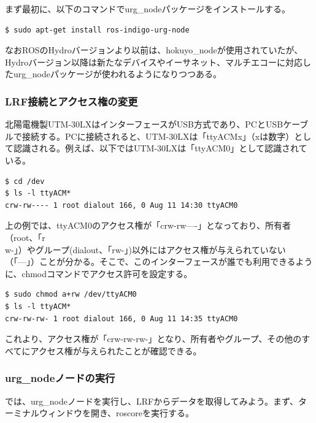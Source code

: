 まず最初に、以下のコマンドでurg\_nodeパッケージをインストールする。

\begin{lstlisting}[language=ROS]
$ sudo apt-get install ros-indigo-urg-node
\end{lstlisting}

なおROSのHydroバージョンより以前は、hokuyo\_nodeが使用されていたが、Hydroバージョン以降は新たなデバイスやイーサネット、マルチエコーに対応したurg\_nodeパッケージが使われるようになりつつある。

\subsubsection{LRF接続とアクセス権の変更}

北陽電機製UTM-30LXはインターフェースがUSB方式であり、PCとUSBケーブルで接続する。PCに接続されると、UTM-30LXは「ttyACMx」（xは数字）として認識される。例えば、以下ではUTM-30LXは「ttyACM0」として認識されている。

\begin{lstlisting}[language=ROS]
$ cd /dev
$ ls -l ttyACM*
crw-rw---- 1 root dialout 166, 0 Aug 11 14:30 ttyACM0
\end{lstlisting}

上の例では、ttyACM0のアクセス権が「crw-rw----」となっており、所有者（root、「r\\w-」）やグループ(dialout、「rw-」)以外にはアクセス権が与えられていない（「---」）ことが分かる。そこで、このインターフェースが誰でも利用できるように、chmodコマンドでアクセス許可を設定する。

\begin{lstlisting}[language=ROS]
$ sudo chmod a+rw /dev/ttyACM0
$ ls -l ttyACM*
crw-rw-rw- 1 root dialout 166, 0 Aug 11 14:35 ttyACM0
\end{lstlisting}

これより、アクセス権が「crw-rw-rw-」となり、所有者やグループ、その他のすべてにアクセス権が与えられたことが確認できる。

\subsubsection{urg\_nodeノードの実行}

では、urg\_nodeノードを実行し、LRFからデータを取得してみよう。まず、ターミナルウィンドウを開き、roscoreを実行する。

